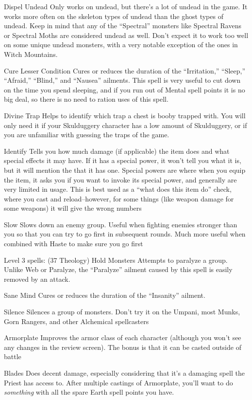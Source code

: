 \documentclass[12pt]{article}
\begin{document}
Dispel Undead Only works on undead, but there's a lot of undead in the
game. It works more often on the skeleton types of undead than the ghost
types of undead. Keep in mind that any of the ``Spectral'' monsters like
Spectral Ravens or Spectral Moths are considered undead as well. Don't
expect it to work too well on some unique undead monsters, with a very
notable exception of the ones in Witch Mountains.

Cure Lesser Condition Cures or reduces the duration of the
``Irritation,'' ``Sleep,'' ``Afraid,'' ``Blind,'' and ``Nausea''
ailments. This spell is very useful to cut down on the time you spend
sleeping, and if you run out of Mental spell points it is no big deal,
so there is no need to ration uses of this spell.

Divine Trap Helps to identify which trap a chest is booby trapped with.
You will only need it if your Skulduggery character has a low amount of
Skulduggery, or if you are unfamiliar with guessing the traps of the
game.

Identify Tells you how much damage (if applicable) the item does and
what special effects it may have. If it has a special power, it won't
tell you what it is, but it will mention the that it has one. Special
powers are where when you equip the item, it asks you if you want to
invoke its special power, and generally are very limited in usage. This
is best used as a ``what does this item do'' check, where you cast and
reload--however, for some things (like weapon damage for some weapons)
it will give the wrong numbers

Slow Slows down an enemy group. Useful when fighting enemies stronger
than you so that you can try to go first in subsequent rounds. Much more
useful when combined with Haste to make sure you go first

Level 3 spells: (37 Theology) Hold Monsters Attempts to paralyze a
group. Unlike Web or Paralyze, the ``Paralyze'' ailment caused by this
spell is easily removed by an attack.

Sane Mind Cures or reduces the duration of the ``Insanity'' ailment.

Silence Silences a group of monsters. Don't try it on the Umpani, most
Munks, Gorn Rangers, and other Alchemical spellcasters

Armorplate Improves the armor class of each character (although you
won't see any changes in the review screen). The bonus is that it can be
casted outside of battle

Blades Does decent damage, especially considering that it's a damaging
spell the Priest has access to. After multiple castings of Armorplate,
you'll want to do \emph{something} with all the spare Earth spell points
you have.
\end{document}
